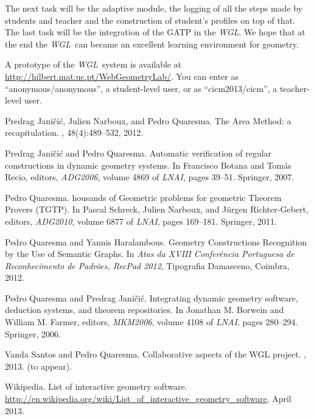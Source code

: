 \documentclass{llncs}
\newcommand{\WGL}{{\em WGL}}
\begin{document}
The next task will be the adaptive module, the logging of all the
steps made by students and teacher and the construction of student's
profiles on top of that. The last task will be the integration of the
GATP in the \WGL. We hope that at the end the \WGL\ can became an
excellent learning environment for geometry.

A prototype of the \WGL\ system is available at
\url{http://hilbert.mat.uc.pt/WebGeometryLab/}. You can enter as
``anonymous/anonymous'', a student-level user, or as
``cicm2013/cicm'', a teacher-level user.

\newcommand{\noopsort}[1]{} \newcommand{\singleletter}[1]{#1}
\begin{thebibliography}{1}

Predrag Jani\v{c}i\'c, Julien Narboux, and Pedro Quaresma.
\newblock The {A}rea {M}ethod: a recapitulation.
, 48(4):489--532, 2012.

Predrag Jani\v{c}i\'c and Pedro Quaresma.
\newblock Automatic verification of regular constructions in dynamic geometry
  systems.
\newblock In Francisco Botana and Tom\'as Recio, editors, {\em ADG2006},
volume 4869 of {\em LNAI}, pages 39--51. Springer, 2007. 

Pedro Quaresma.
housands of {G}eometric problems for geometric {T}heorem {P}rovers
  ({TGTP}).
\newblock In Pascal Schreck, Julien Narboux, and J{\"u}rgen Richter-Gebert,
  editors, {\em ADG2010}, volume 6877 of {\em
    LNAI}, pages 169--181. Springer, 2011. 

Pedro Quaresma and Yannis Haralambous.
\newblock Geometry Constructions Recognition by the Use of Semantic 
    Graphs.  
\newblock In {\em Atas da XVIII Confer{\^e}ncia Portuguesa de
  Reconhecimento de Padr{\~o}es, {R}ec{P}ad 2012}, 
Tipografia Damasceno, Coimbra, 2012.
  
Pedro Quaresma and Predrag Jani\v{c}i\'c.
\newblock Integrating dynamic geometry software, deduction systems, and theorem
  repositories.
\newblock In Jonathan {M. Borwein} and William {M. Farmer}, editors, {\em
  MKM2006}, volume 4108 of {\em LNAI}, pages
280--294. Springer, 2006. 

Vanda Santos and Pedro Quaresma.
\newblock Collaborative aspects of the {WGL} project.
, 2013.
\newblock (to appear).

Wikipedia.
\newblock List of interactive geometry software.
\newblock
  \url{http://en.wikipedia.org/wiki/List_of_interactive_geometry_software},
  April 2013.

\end{thebibliography}
\end{document}

